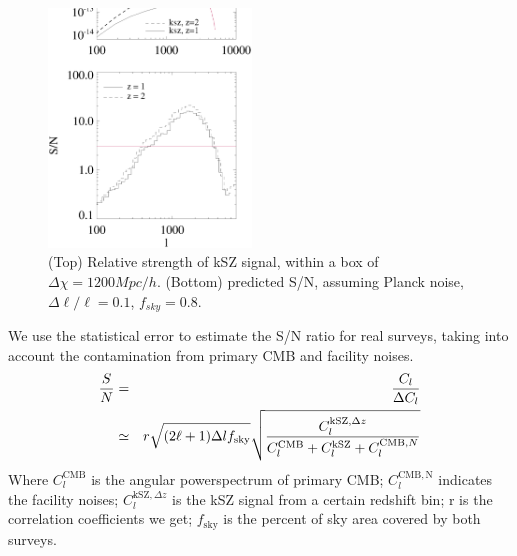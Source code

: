 \begin{figure}[tbp]
\begin{center}
\includegraphics[width=0.48\textwidth]{Cl_rsd_sn_z1z2.eps}
\end{center}
\vspace{-0.7cm}
\caption{(Top) Relative strength of kSZ signal, within a box of $\Delta \chi=1200 Mpc/h$. 
    (Bottom) predicted S/N, assuming Planck noise, $\Delta \ell/\ell=0.1$, $f_{sky}=0.8$. 
}
\label{fig:sn}
\end{figure}
We use the statistical error to estimate the S/N ratio for real surveys, 
taking into account the contamination from primary CMB and facility noises.
\begin{eqnarray}
    \frac{S}{N}&=&\frac{C_l}{\Delta C_l}\\\nonumber
               &\simeq&
    r\sqrt{(2\ell+1)\Delta l f_\mathrm{sky}}\sqrt{\frac{C_l^{\mathrm{kSZ},\Delta z}}{C_l^{\mathrm{CMB}}+C_l^\mathrm{kSZ}+C_l^{\mathrm{CMB},N}}}
\end{eqnarray}
Where $C_l^\mathrm{CMB}$ is the angular powerspectrum of primary CMB; 
$C_l^\mathrm{CMB,N}$ indicates the facility noises; 
$C_l^{\mathrm{kSZ},\Delta z}$ is the kSZ signal from a certain redshift bin; 
r is the correlation coefficients we get; 
$f_\mathrm{sky}$ is the percent of sky area covered by both surveys.

